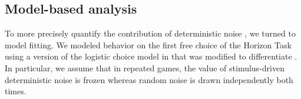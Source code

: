 \documentclass[12pt]{article}
\begin{document}
	\subsection*{Model-based analysis }
	
	To more precisely quantify the contribution of deterministic noise , we turned to model fitting. We modeled behavior on the first free choice of the Horizon Task using a version of the logistic choice model in \citep{wilson2014} that was modified to differentiate . In particular, we assume that in repeated games, the value of stimulus-driven deterministic noise is frozen whereas random noise is drawn independently both times. 
	
\end{document}
